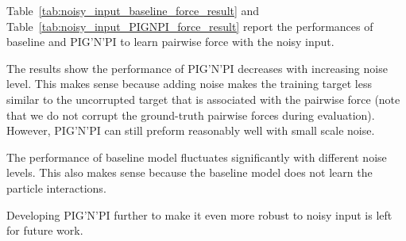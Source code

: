 \documentclass{article}
\newcommand{\pignpi}{PIG'N'PI\xspace}
\begin{document}
Table~\ref{tab:noisy_input_baseline_force_result} and Table~\ref{tab:noisy_input_PIGNPI_force_result} report the performances of baseline and \pignpi to learn pairwise force with the noisy input.



The results show the performance of \pignpi decreases with increasing noise level. This makes sense because adding noise makes the training target less similar to the uncorrupted target that is associated with the pairwise force (note that we do not corrupt the ground-truth pairwise forces during evaluation). However, \pignpi can still preform reasonably well with small scale noise.

The performance of baseline model fluctuates significantly with different noise levels. This also makes sense because the baseline model does not learn the particle interactions.


Developing \pignpi further to make it even more robust to noisy input is left for future work.
\end{document}
